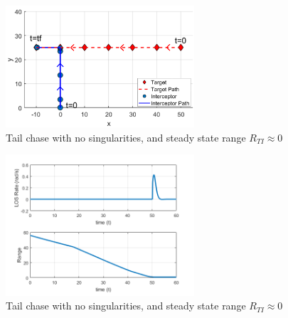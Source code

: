\documentclass[conference]{IEEEtran}
\begin{document}
\begin{figure}[H]
	\centering
	\includegraphics[width=7cm] {fixedSingularity}
	\caption{Tail chase with no singularities, and steady state range $R_{TI}\approx0$}
	\label{fig:modifiedPNsuccess}
	\hspace*{0mm}
\end{figure}

\begin{figure}[H]
	\centering
	\includegraphics[width=7cm] {ptx50_range_LOSrate}
	\caption{Tail chase with no singularities, and steady state range $R_{TI}\approx0$}
	\label{fig:modifiedPNsuccessLOS}
	\hspace*{0mm}
\end{figure}


\end{document}
